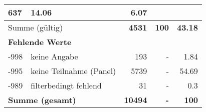 \begin{longtable}{lXrrr}
       \num{637} &
       \num[round-mode=places,round-precision=2]{14,06} &
         \num[round-mode=places,round-precision=2]{6,07} \\
     \midrule
     \multicolumn{2}{l}{Summe (gültig)} &
       \textbf{\num{4531}} &
     \textbf{100} &
       \textbf{\num[round-mode=places,round-precision=2]{43,18}} \\
     \multicolumn{5}{l}{\textbf{Fehlende Werte}}\\
       -998 &
       keine Angabe &
         \num{193} &
        - &
         \num[round-mode=places,round-precision=2]{1,84} \\
       -995 &
       keine Teilnahme (Panel) &
         \num{5739} &
        - &
         \num[round-mode=places,round-precision=2]{54,69} \\
       -989 &
       filterbedingt fehlend &
         \num{31} &
        - &
         \num[round-mode=places,round-precision=2]{0,3} \\
     \midrule
     \multicolumn{2}{l}{\textbf{Summe (gesamt)}} &
          \textbf{\num{10494}} &
        \textbf{-} &
        \textbf{100} \\
     \bottomrule
     \end{longtable}
     
